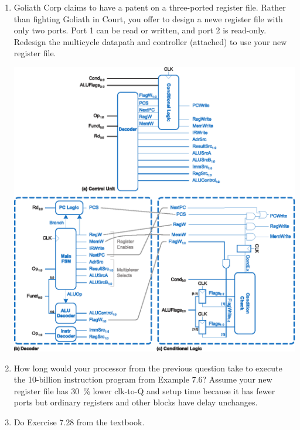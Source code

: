 \documentclass{ps}
\begin{document}
\begin{enumerate}
\item Goliath Corp claims to have a patent on a three-ported register
  file.  Rather than fighting Goliath in Court, you offer to design a
  newe register file with only two ports.  Port 1 can be read or
  written, and port 2 is read-only.  Redesign the multicycle datapath
  and controller (attached) {\figurebelow} to use your new register
  file.
  \begin{center}
    \includegraphics[width=\linewidth]
    {figures/ddca-multicycle-control-unit.eps}
  \end{center}

  \begin{solution}
  \end{solution}

\item How long would your processor from the previous question take to
  execute the 10-billion instruction program from Example 7.6?  Assume
  your new register file has \SI{30}{\percent} lower clk-to-Q and
  setup time because it has fewer ports but ordinary registers and
  other blocks have delay unchanges.

  \begin{solution}
  \end{solution}

\item Do Exercise 7.28 from the textbook.


\end{enumerate}
\end{document}
